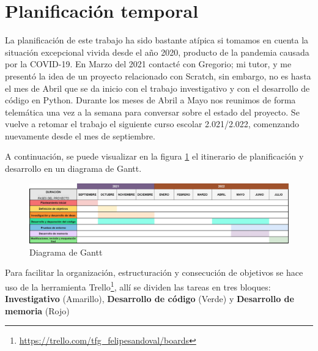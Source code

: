 \documentclass[a4paper, 12pt]{book}
\begin{document}
\section{Planificación temporal}
\label{sec:planificacion-temporal}


La planificación de este trabajo ha sido bastante atípica si tomamos en cuenta la situación excepcional vivida desde el año 2020, producto de la pandemia causada por la COVID-19. En Marzo del 2021 contacté con Gregorio; mi tutor, y me presentó la idea de un proyecto relacionado con Scratch, sin embargo, no es hasta el mes de Abril que se da inicio con el trabajo investigativo y con el desarrollo de código en Python. Durante los meses de Abril a Mayo nos reunimos de forma telemática una vez a la semana para conversar sobre el estado del proyecto. Se vuelve a retomar el trabajo el siguiente curso escolar 2.021/2.022, comenzando nuevamente desde el mes de septiembre.

A continuación, se puede visualizar en la figura \ref{fig:diagrama_gantt} el itinerario de planificación y desarrollo en un diagrama de Gantt.

\begin{figure}[h]
	\centering
    \includegraphics[width=16cm, keepaspectratio]{img/gantt.jpg}
    \caption{Diagrama de Gantt}
    \label{fig:diagrama_gantt}
\end{figure}

\pagebreak 
Para facilitar la organización, estructuración y consecución de objetivos se hace uso de la herramienta Trello\footnote{\url{https://trello.com/tfg_felipesandoval/boards}}, allí se dividen las tareas en tres bloques: \textbf{Investigativo} (Amarillo), \textbf{Desarrollo de código} (Verde) y \textbf{Desarrollo de memoria} (Rojo) 
\end{document}
